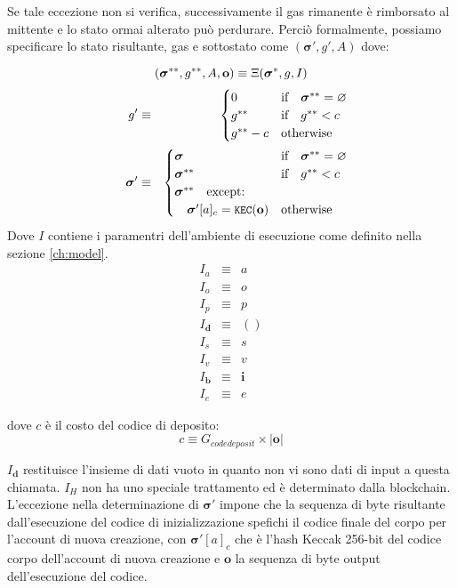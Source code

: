 \documentclass[9pt,oneside]{amsart}
\begin{document}
\begin{multicols}{2}
Se tale eccezione non si verifica, successivamente il gas rimanente è rimborsato al mittente e lo stato ormai alterato può perdurare. Perciò formalmente, possiamo specificare lo stato risultante, gas e sottostato come $(\boldsymbol{\sigma}', g', A)$ dove:

\begin{equation}
(\boldsymbol{\sigma}^{**}, g^{**}, A, \mathbf{o}) \equiv \Xi(\boldsymbol{\sigma}^*, g, I) \\
\end{equation}
\begin{eqnarray}
\quad g' & \equiv & \begin{cases}
0 & \text{if} \quad \boldsymbol{\sigma}^{**} = \varnothing \\
g^{**} & \text{if} \quad g^{**} < c \\
g^{**} - c & \text{otherwise} \\
\end{cases} \\
\quad \boldsymbol{\sigma}' & \equiv & \begin{cases}
\boldsymbol{\sigma} & \text{if} \quad \boldsymbol{\sigma}^{**} = \varnothing \\
\boldsymbol{\sigma}^{**} & \text{if} \quad g^{**} < c \\
\boldsymbol{\sigma}^{**} \quad \text{except:} & \\
\quad\boldsymbol{\sigma}'[a]_c = \texttt{\small KEC}(\mathbf{o}) & \text{otherwise}
\end{cases}
\end{eqnarray}
Dove $I$ contiene i paramentri dell'ambiente di esecuzione come definito nella sezione \ref{ch:model}.
\begin{eqnarray}
I_a & \equiv & a \\
I_o & \equiv & o \\
I_p & \equiv & p \\
I_\mathbf{d} & \equiv & () \\
I_s & \equiv & s \\
I_v & \equiv & v \\
I_\mathbf{b} & \equiv & \mathbf{i} \\
I_e & \equiv & e
\end{eqnarray}

dove $c$ è il costo del codice di deposito:
\begin{equation}
c \equiv G_{codedeposit} \times |\mathbf{o}|
\end{equation}

$I_\mathbf{d}$ restituisce l'insieme di dati vuoto in quanto non vi sono dati di input a questa chiamata. $I_H$ non ha uno speciale trattamento ed è determinato dalla blockchain. L'eccezione nella determinazione di $\boldsymbol{\sigma}'$ impone che la sequenza di byte risultante dall'esecuzione del codice di inizializzazione spefichi il codice finale del corpo per l'account di nuova creazione, con $\boldsymbol{\sigma}'[a]_c$ che è l'hash Keccak 256-bit del codice corpo dell'account di nuova creazione e $\mathbf{o}$ la sequenza di byte output dell'esecuzione del codice.


\end{multicols}
\end{document}
